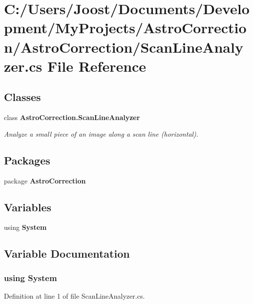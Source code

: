 \section{C:/Users/Joost/Documents/Development/MyProjects/AstroCorrection/AstroCorrection/ScanLineAnalyzer.cs File Reference}
\label{_scan_line_analyzer_8cs}
\subsection*{Classes}
\begin{DoxyCompactItemize}
\item 
class {\bf AstroCorrection.ScanLineAnalyzer}
\begin{DoxyCompactList}\small\item\em Analyze a small piece of an image along a scan line (horizontal). \item\end{DoxyCompactList}\end{DoxyCompactItemize}
\subsection*{Packages}
\begin{DoxyCompactItemize}
\item 
package {\bf AstroCorrection}
\end{DoxyCompactItemize}
\subsection*{Variables}
\begin{DoxyCompactItemize}
\item 
﻿using {\bf System}
\end{DoxyCompactItemize}


\subsection{Variable Documentation}
\subsubsection[{System}]{\setlength{\rightskip}{0pt plus 5cm}﻿using {\bf System}}\label{_scan_line_analyzer_8cs_a81a223a02c34d82b47199f08308847f2}


Definition at line 1 of file ScanLineAnalyzer.cs.